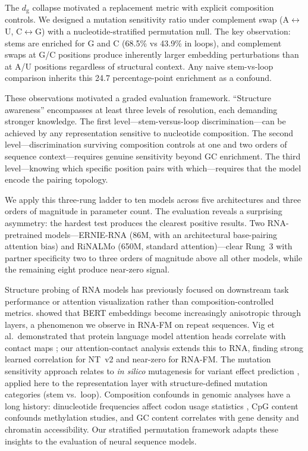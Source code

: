 \documentclass[11pt]{article}
\newcommand{\dg}{d_{\mathrm{g}}}
\begin{document}
The $\dg$ collapse motivated a replacement metric with explicit
composition controls.  We designed a mutation sensitivity ratio under
complement swap (A$\leftrightarrow$U, C$\leftrightarrow$G) with a
nucleotide-stratified permutation null.  The key observation: stems
are enriched for G and C (68.5\% vs 43.9\% in loops), and complement
swaps at G/C positions produce inherently larger embedding
perturbations than at A/U positions regardless of structural context.
Any naive stem-vs-loop comparison inherits this 24.7 percentage-point
enrichment as a confound.

These observations motivated a graded evaluation framework.
``Structure awareness'' encompasses at least three levels of
resolution, each demanding stronger knowledge.  The first
level---stem-versus-loop discrimination---can be achieved by any
representation sensitive to nucleotide composition.  The second
level---discrimination surviving composition controls at one and two
orders of sequence context---requires genuine sensitivity beyond GC
enrichment.  The third level---knowing which specific position pairs
with which---requires that the model encode the pairing topology.

We apply this three-rung ladder to ten models across five
architectures and three orders of magnitude in parameter count.  The
evaluation reveals a surprising asymmetry: the hardest test produces
the clearest positive results.  Two RNA-pretrained models---ERNIE-RNA
(86M, with an architectural base-pairing attention bias) and RiNALMo
(650M, standard attention)---clear Rung~3 with partner specificity
two to three orders of magnitude above all other models, while the
remaining eight produce near-zero signal.

Structure probing of RNA models has previously focused on
downstream task performance \citep{rnafm,dalla2023nucleotide} or
attention visualization rather than composition-controlled metrics.
\citet{ethayarajh2019} showed that BERT embeddings become increasingly
anisotropic through layers, a phenomenon we observe in RNA-FM on
repeat sequences.  Vig et al.\ demonstrated that protein language
model attention heads correlate with contact maps
\citep{vig2020bertology}; our attention-contact analysis extends this
to RNA, finding strong learned correlation for NT~v2 and near-zero
for RNA-FM.  The mutation sensitivity approach relates to \emph{in
silico} mutagenesis for variant effect prediction
\citep{frazer2021disease}, applied here to the representation layer
with structure-defined mutation categories (stem vs.\ loop).
Composition confounds in genomic analyses have a long history:
dinucleotide frequencies affect codon usage statistics
\citep{karlin1998dinucleotide}, CpG content confounds methylation
studies, and GC content correlates with gene density and chromatin
accessibility.  Our stratified permutation framework adapts these
insights to the evaluation of neural sequence models.
\end{document}
